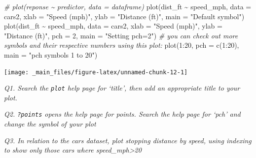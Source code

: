 \documentclass[
  11pt,
  a4paper,
]{book}
\newenvironment{Shaded}{\begin{snugshade}}{\end{snugshade}}
\newcommand{\AttributeTok}[1]{\textcolor[rgb]{0.77,0.63,0.00}{#1}}
\newcommand{\CommentTok}[1]{\textcolor[rgb]{0.56,0.35,0.01}{\textit{#1}}}
\newcommand{\DecValTok}[1]{\textcolor[rgb]{0.00,0.00,0.81}{#1}}
\newcommand{\FunctionTok}[1]{\textcolor[rgb]{0.00,0.00,0.00}{#1}}
\newcommand{\NormalTok}[1]{#1}
\newcommand{\SpecialCharTok}[1]{\textcolor[rgb]{0.00,0.00,0.00}{#1}}
\newcommand{\StringTok}[1]{\textcolor[rgb]{0.31,0.60,0.02}{#1}}
\begin{document}
\begin{Shaded}
\begin{Highlighting}[]
\CommentTok{\# plot(reponse \textasciitilde{} predictor, data = dataframe)}
\FunctionTok{plot}\NormalTok{(dist\_ft }\SpecialCharTok{\textasciitilde{}}\NormalTok{ speed\_mph,}
  \AttributeTok{data =}\NormalTok{ cars2, }\AttributeTok{xlab =} \StringTok{"Speed (mph)"}\NormalTok{, }\AttributeTok{ylab =} \StringTok{"Distance (ft)"}\NormalTok{,}
  \AttributeTok{main =} \StringTok{"Default symbol"}\NormalTok{)}
\FunctionTok{plot}\NormalTok{(dist\_ft }\SpecialCharTok{\textasciitilde{}}\NormalTok{ speed\_mph,}
  \AttributeTok{data =}\NormalTok{ cars2, }\AttributeTok{xlab =} \StringTok{"Speed (mph)"}\NormalTok{, }\AttributeTok{ylab =} \StringTok{"Distance (ft)"}\NormalTok{,}
  \AttributeTok{pch =} \DecValTok{2}\NormalTok{, }\AttributeTok{main =} \StringTok{"Setting \textquotesingle{}pch=2\textquotesingle{}"}\NormalTok{)}
\CommentTok{\# you can check out more symbols and their respective numbers using this plot:}
\FunctionTok{plot}\NormalTok{(}\DecValTok{1}\SpecialCharTok{:}\DecValTok{20}\NormalTok{, }\AttributeTok{pch =} \FunctionTok{c}\NormalTok{(}\DecValTok{1}\SpecialCharTok{:}\DecValTok{20}\NormalTok{), }\AttributeTok{main =} \StringTok{"\textquotesingle{}pch\textquotesingle{} symbols 1 to 20"}\NormalTok{)}
\end{Highlighting}
\end{Shaded}

\begin{center}\texttt{[image: \_main\_files/figure-latex/unnamed-chunk-12-1]} \end{center}

\emph{Q1. Search the \texttt{plot} help page for `title', then add an appropriate title to your plot.}

\emph{Q2. \texttt{?points} opens the help page for points. Search the help page for `pch' and change the symbol of your plot}

\emph{Q3. In relation to the cars dataset, plot stopping distance by speed, using indexing to show only those cars where speed\_mph\textgreater20}

\begin{Shaded}
\end{Shaded}
\end{document}

